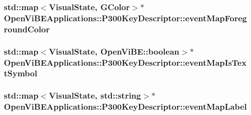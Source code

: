 \label{classOpenViBEApplications_1_1P300KeyDescriptor_ac777c1ed3373c3a7b7f8a628e80436ed}
\hypertarget{classOpenViBEApplications_1_1P300KeyDescriptor_abf2e45d487a40baae005baacde8c05f5}{
\subsubsection[{eventMapForegroundColor}]{\setlength{\rightskip}{0pt plus 5cm}std::map$<${\bf VisualState}, {\bf GColor}$>$$\ast$ {\bf OpenViBEApplications::P300KeyDescriptor::eventMapForegroundColor}}}
\label{classOpenViBEApplications_1_1P300KeyDescriptor_abf2e45d487a40baae005baacde8c05f5}
\hypertarget{classOpenViBEApplications_1_1P300KeyDescriptor_a3ca2fb59895cdc4f5093f28169415d86}{
\subsubsection[{eventMapIsTextSymbol}]{\setlength{\rightskip}{0pt plus 5cm}std::map$<${\bf VisualState}, OpenViBE::boolean$>$$\ast$ {\bf OpenViBEApplications::P300KeyDescriptor::eventMapIsTextSymbol}}}
\label{classOpenViBEApplications_1_1P300KeyDescriptor_a3ca2fb59895cdc4f5093f28169415d86}
\hypertarget{classOpenViBEApplications_1_1P300KeyDescriptor_acb8b5f94f436944aa5c528bb9d3601b8}{
\subsubsection[{eventMapLabel}]{\setlength{\rightskip}{0pt plus 5cm}std::map$<${\bf VisualState}, std::string$>$$\ast$ {\bf OpenViBEApplications::P300KeyDescriptor::eventMapLabel}}}
